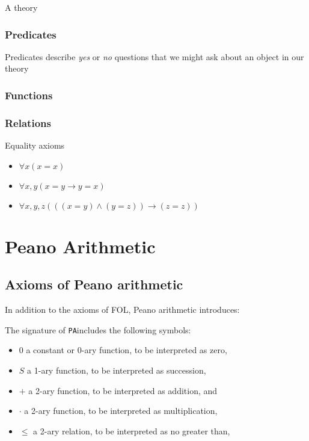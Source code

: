 \documentclass[12pt]{article}
\newcommand{\PA}{\texttt{PA}}
\begin{document}
	A theory
	
	\subsubsection{Predicates}
	
	Predicates describe \emph{yes} or \emph{no} questions that we might ask about an object in our theory
	
	\subsubsection{Functions}	
	\subsubsection{Relations}
	
	Equality axioms
	
	\begin{tcolorbox}[colback=green!5!white,colframe=green!75!black,title={\bf Axioms of equality}]
		\begin{itemize}[itemsep=0pt]
			\item $\forall x (x = x)$
			\item $\forall x, y (x=y \to y=x)$
			\item $\forall x, y, z (((x=y) \land (y=z)) \to (z=z))$
		\end{itemize}
	\end{tcolorbox}
	
	\section{Peano Arithmetic}
	
	\subsection{Axioms of Peano arithmetic}
	In addition to the axioms of FOL, Peano arithmetic introduces:
	
	The signature of \PA includes the following symbols:
	\begin{itemize}
		\item $0$ a constant or 0-ary function, to be interpreted as zero,
		\item $S$ a 1-ary function, to be interpreted as succession,
		\item $+$ a 2-ary function, to be interpreted as addition, and
		\item $\cdot$ a 2-ary function, to be interpreted as multiplication,
		\item $\le$ a 2-ary relation, to be interpreted as no greater than,
	\end{itemize}
	
\end{document}
